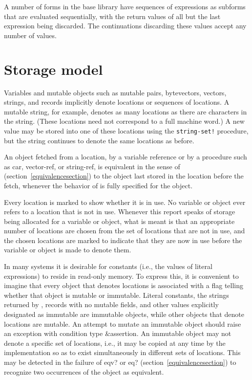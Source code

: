 A number of forms in the base library have sequences of expressions
as subforms that are evaluated sequentially, with the return values of
all but the last expression being discarded.  The continuations
discarding these values accept any number of values.

\section{Storage model}
\label{storagemodel}

Variables and mutable objects such as mutable pairs, bytevectors, vectors, strings,
and records implicitly
denote locations or sequences of locations.  A
mutable string, for example, denotes as many locations as there are characters in the string. 
(These locations need not correspond to a full machine word.) A new value may be
stored into one of these locations using the {\tt string-set!} procedure, but
the string continues to denote the same locations as before.

An object fetched from a location, by a variable reference or by
a procedure such as {\cf car}, {\cf vector-ref}, or {\cf string-ref}, is
equivalent in the sense of  %
(section~\ref{equivalencesection})
to the object last stored in the location before the fetch, whenever
the behavior of  is fully specified for the object.

Every location is marked to show whether it is in use.
No variable or object ever refers to a location that is not in use.
Whenever this report speaks of storage being allocated for a variable
or object, what is meant is that an appropriate number of locations are
chosen from the set of locations that are not in use, and the chosen
locations are marked to indicate that they are now in use before the variable
or object is made to denote them.

In many systems it is desirable for constants (i.e., the values of
literal expressions) to reside in read-only memory.  To express this,
it is convenient to imagine that every object that denotes locations
is associated with a flag telling whether that object is
mutable or immutable.  Literal
constants, the strings returned by , records with
no mutable fields, and other values explicitly designated as immutable
are immutable objects, while other objects that denote locations
are mutable.  
An attempt to mutate an immutable object
should raise an exception with condition type {\cf\&assertion}.
An immutable object may not denote a specific set of locations, i.e.,
it may be copied at any time by the implementation so as to exist
simultaneously in different sets of locations.
This may be detected in the failure of {\cf eqv?} or {\cf eq?}
(section~\ref{equivalencesection}) to
recognize two occurrences of the object as equivalent.

